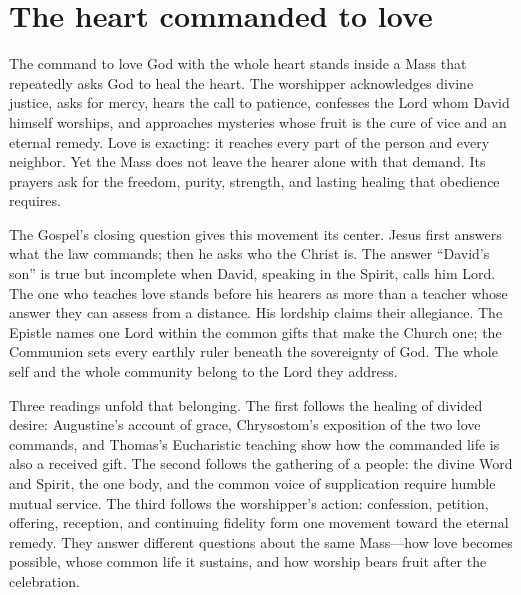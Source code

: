 \section{The heart commanded to love}

The command to love God with the whole heart stands inside a Mass that repeatedly asks God to heal the heart. The worshipper acknowledges divine justice, asks for mercy, hears the call to patience, confesses the Lord whom David himself worships, and approaches mysteries whose fruit is the cure of vice and an eternal remedy. Love is exacting: it reaches every part of the person and every neighbor. Yet the Mass does not leave the hearer alone with that demand. Its prayers ask for the freedom, purity, strength, and lasting healing that obedience requires.

The Gospel's closing question gives this movement its center. Jesus first answers what the law commands; then he asks who the Christ is. The answer ``David's son'' is true but incomplete when David, speaking in the Spirit, calls him Lord. The one who teaches love stands before his hearers as more than a teacher whose answer they can assess from a distance. His lordship claims their allegiance. The Epistle names one Lord within the common gifts that make the Church one; the Communion sets every earthly ruler beneath the sovereignty of God. The whole self and the whole community belong to the Lord they address.

Three readings unfold that belonging. The first follows the healing of divided desire: Augustine's account of grace, Chrysostom's exposition of the two love commands, and Thomas's Eucharistic teaching show how the commanded life is also a received gift. The second follows the gathering of a people: the divine Word and Spirit, the one body, and the common voice of supplication require humble mutual service. The third follows the worshipper's action: confession, petition, offering, reception, and continuing fidelity form one movement toward the eternal remedy. They answer different questions about the same Mass---how love becomes possible, whose common life it sustains, and how worship bears fruit after the celebration.

